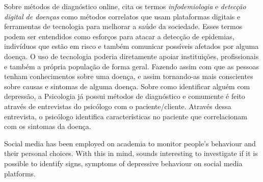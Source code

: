 Sobre métodos de diagnóstico online, \cite{Horvitz} cita os termos \textit{infodemiologia} e \emph{detecção digital de doenças} como métodos correlatos que usam plataformas digitais e ferramentas de tecnologia para melhorar a saúde da sociedade. Esses termos podem ser entendidos como esforços para atacar a detecção de epidemias, indivíduos que estão em risco e também comunicar possíveis afetados por alguma doença. O uso de tecnologia poderia diretamente apoiar instituições, profissionais e também a própria população de forma geral. Fazendo assim com que as pessoas tenham conhecimentos sobre uma doença, e assim tornando-as mais conscientes sobre causas e sintomas de alguma doença.
Sobre como identificar alguém com depressão, a Psicologia já possui métodos de diagnóstico e comumente é feito através de entrevistas do psicólogo com o paciente/cliente. Através dessa entrevista, o psicólogo identifica características no paciente que correlacionam com os sintomas da doença.


Social media has been employed on academia to monitor people's behaviour and their personal choices. With this in mind, sounds interesting to investigate if it is possible to identify signs, symptoms of depressive behaviour on social media platforms.

